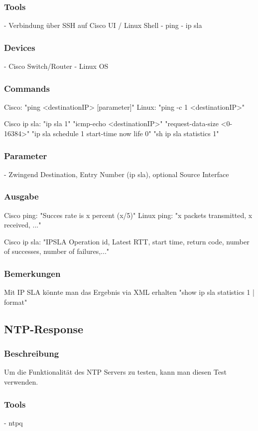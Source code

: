 \documentclass[a4,12pt]{scrartcl}
\begin{document}
\subsubsection{Tools}
- Verbindung über SSH auf Cisco UI / Linux Shell
- ping
- ip sla

\subsubsection{Devices}
- Cisco Switch/Router
- Linux OS
\subsubsection{Commands}
Cisco: "ping <destinationIP> [parameter]"
Linux: "ping -c 1 <destinationIP>"

Cisco ip sla: 	"ip sla 1"
			 	"icmp-echo <destinationIP>"
			  	"request-data-size <0-16384>"
			  	"ip sla schedule 1 start-time now life 0"
			  	"sh ip sla statistics 1"

\subsubsection{Parameter}
- Zwingend Destination, Entry Number (ip sla), optional Source Interface
\subsubsection{Ausgabe}
Cisco ping: "Succes rate is x percent (x/5)"
Linux ping: "x packets transmitted, x received, ..."

Cisco ip sla: "IPSLA Operation id, Latest RTT, start time, return code, number of successes, number of failures,..."

\subsubsection{Bemerkungen}
Mit IP SLA könnte man das Ergebnis via XML erhalten
"show ip sla statistics 1 | format"

\subsection{NTP-Response}
\subsubsection{Beschreibung}
Um die Funktionalität des NTP Servers zu testen, kann man diesen Test verwenden.
\subsubsection{Tools}
- ntpq
\end{document}
